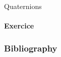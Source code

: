\documentclass[aspectratio=169]{beamer}
\begin{document}






\begin{frame}{Quaternions}
    \framesubtitle{Exercice}

\end{frame}


\begin{frame}[t, allowframebreaks]
    \frametitle{Bibliography}
    
\end{frame}
\end{document}
